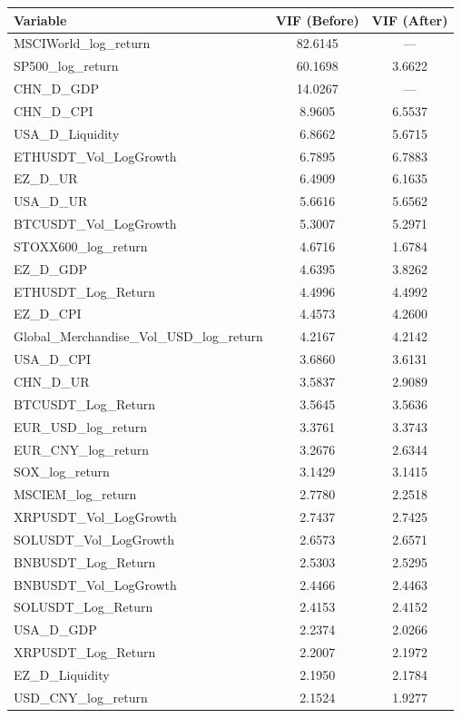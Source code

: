 \begin{tabular}{lcc}
  \toprule
  \textbf{Variable} & \textbf{VIF (Before)} & \textbf{VIF (After)} \\ 
  \midrule
  MSCIWorld\_log\_return & 82.6145 & --- \\ 
  SP500\_log\_return & 60.1698 & 3.6622 \\ 
  CHN\_D\_GDP & 14.0267 & --- \\ 
  CHN\_D\_CPI & 8.9605 & 6.5537 \\ 
  USA\_D\_Liquidity & 6.8662 & 5.6715 \\ 
  ETHUSDT\_Vol\_LogGrowth & 6.7895 & 6.7883 \\ 
  EZ\_D\_UR & 6.4909 & 6.1635 \\ 
  USA\_D\_UR & 5.6616 & 5.6562 \\ 
  BTCUSDT\_Vol\_LogGrowth & 5.3007 & 5.2971 \\ 
  STOXX600\_log\_return & 4.6716 & 1.6784 \\ 
  EZ\_D\_GDP & 4.6395 & 3.8262 \\ 
  ETHUSDT\_Log\_Return & 4.4996 & 4.4992 \\ 
  EZ\_D\_CPI & 4.4573 & 4.2600 \\ 
  Global\_Merchandise\_Vol\_USD\_log\_return & 4.2167 & 4.2142 \\ 
  USA\_D\_CPI & 3.6860 & 3.6131 \\ 
  CHN\_D\_UR & 3.5837 & 2.9089 \\ 
  BTCUSDT\_Log\_Return & 3.5645 & 3.5636 \\ 
  EUR\_USD\_log\_return & 3.3761 & 3.3743 \\ 
  EUR\_CNY\_log\_return & 3.2676 & 2.6344 \\ 
  SOX\_log\_return & 3.1429 & 3.1415 \\ 
  MSCIEM\_log\_return & 2.7780 & 2.2518 \\ 
  XRPUSDT\_Vol\_LogGrowth & 2.7437 & 2.7425 \\ 
  SOLUSDT\_Vol\_LogGrowth & 2.6573 & 2.6571 \\ 
  BNBUSDT\_Log\_Return & 2.5303 & 2.5295 \\ 
  BNBUSDT\_Vol\_LogGrowth & 2.4466 & 2.4463 \\ 
  SOLUSDT\_Log\_Return & 2.4153 & 2.4152 \\ 
  USA\_D\_GDP & 2.2374 & 2.0266 \\ 
  XRPUSDT\_Log\_Return & 2.2007 & 2.1972 \\ 
  EZ\_D\_Liquidity & 2.1950 & 2.1784 \\ 
  USD\_CNY\_log\_return & 2.1524 & 1.9277 \\ 

\end{tabular}
